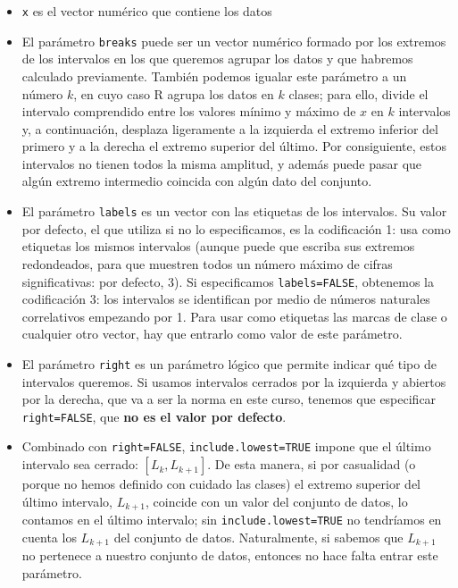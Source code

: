 \documentclass[]{book}
\theoremstyle{definition}
\theoremstyle{definition}
\theoremstyle{definition}
\theoremstyle{remark}
\begin{document}
\begin{itemize}
\item
  \texttt{x} es el vector numérico que contiene los datos
\item
  El parámetro \texttt{breaks} puede ser un vector numérico formado por los extremos de los intervalos en los que queremos agrupar los datos y que habremos calculado previamente. También podemos igualar este parámetro a un número \(k\), en cuyo caso R agrupa los datos en \(k\) clases; para ello, divide el intervalo comprendido entre los valores mínimo y máximo de \(x\) en \(k\) intervalos y, a continuación, desplaza ligeramente a la izquierda el extremo inferior del primero y a la derecha el extremo superior del último. Por consiguiente, estos intervalos no tienen todos la misma amplitud, y además puede pasar que algún extremo intermedio coincida con algún dato del conjunto.
\item
  El parámetro \texttt{labels} es un vector con las etiquetas de los intervalos. Su valor por defecto, el que utiliza si no lo especificamos, es la codificación 1: usa como etiquetas los mismos intervalos (aunque puede que escriba sus extremos redondeados, para que muestren todos un número máximo de cifras significativas: por defecto, 3). Si especificamos \texttt{labels=FALSE}, obtenemos la codificación 3: los intervalos se identifican por medio de números naturales correlativos empezando por 1. Para usar como etiquetas las marcas de clase o cualquier otro vector, hay que entrarlo como valor de este parámetro.
\item
  El parámetro \texttt{right} es un parámetro lógico que permite indicar qué tipo de intervalos queremos. Si usamos intervalos cerrados por la izquierda y abiertos por la derecha, que va a ser la norma en este curso, tenemos que especificar \texttt{right=FALSE}, que \textbf{no es el valor por defecto}.
\item
  Combinado con \texttt{right=FALSE}, \texttt{include.lowest=TRUE} impone que el último intervalo sea cerrado: \([L_k,L_{k+1}]\). De esta manera, si por casualidad (o porque no hemos definido con cuidado las clases) el extremo superior del último intervalo, \(L_{k+1}\), coincide con un valor del conjunto de datos, lo contamos en el último intervalo;
  sin \texttt{include.lowest=TRUE} no tendríamos en cuenta los \(L_{k+1}\) del conjunto de datos. Naturalmente, si sabemos que \(L_{k+1}\) no pertenece a nuestro conjunto de datos, entonces no hace falta entrar este parámetro.
\end{itemize}
\end{document}
